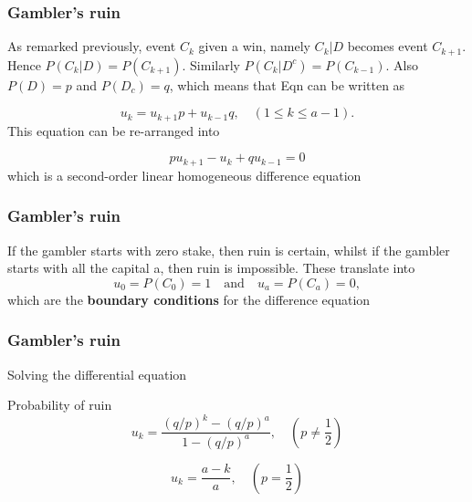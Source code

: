 \documentclass[spanish]{beamer}
\begin{document}
\begin{frame}
\frametitle{Gambler’s ruin}
As remarked previously, event $C_{k}$ given a win, namely $C_{k} \vert D$ becomes event $C_{k+1}$. Hence $P(C_{k} \vert D) = P(C_{k+1} )$. Similarly $P(C_{k} \vert D^{c} ) = P(C_{k-1} )$. Also $P(D) = p$ and $P(D_{c}) = q$, which means that Eqn can be written as

\begin{equation*}
u_{k} = u_{k+1} p + u_{k-1} q, \quad (1 \leq k \leq a -1).
\end{equation*}
This equation can be re-arranged into

\begin{equation*}
 p u_{k+1} -u_{k}+ qu_{k-1} = 0
\end{equation*}
which is a second-order linear homogeneous difference equation

\end{frame}

\begin{frame}
\frametitle{Gambler’s ruin}
If the gambler starts with zero stake, then ruin is certain, whilst if the gambler starts with all the capital a, then ruin is impossible. These translate into
\begin{equation*}
u_{0} = P(C_{0}) = 1 \quad \text{and} \quad u_{a} = P(C_{a}) = 0,
\end{equation*}
which are the \textbf{boundary conditions} for the difference equation
\end{frame}
\begin{frame}
\frametitle{Gambler’s ruin}
Solving the differential equation
\begin{block}{Probability of ruin}
\begin{equation*}
u_{k}=\frac{(q/p)^k-(q/p)^a}{1-(q/p)^a}, \quad (p\neq \frac{1}{2} )
\end{equation*}

\begin{equation*}
u_{k}=\frac{a-k}{a}, \quad (p= \frac{1}{2} )
\end{equation*}
\end{block}


\end{frame}
\end{document}
